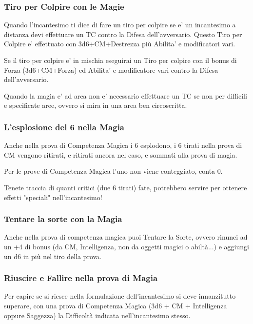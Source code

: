 \subsubsection{Tiro per Colpire con le Magie}

Quando l'incantesimo ti dice di fare un tiro per colpire se e' un incantesimo a distanza devi effettuare un TC contro la Difesa dell'avversario. Questo Tiro per Colpire e' effettuato con 3d6+CM+Destrezza più Abilita' e modificatori vari.

Se il tiro per colpire e' in mischia eseguirai un Tiro per colpire con il bonus di Forza (3d6+CM+Forza) ed Abilita' e modificatore vari contro la Difesa dell'avversario.

Quando la magia e' ad area non e' necessario effettuare un TC se non per difficili e specificate aree, ovvero si mira in una area ben circoscritta.

\subsubsection{L'esplosione del 6 nella Magia}

Anche nella prova di Competenza Magica i 6 esplodono, i 6 tirati nella prova di CM vengono ritirati, e ritirati ancora nel caso, e sommati alla prova di magia.

Per le prove di Competenza Magica l'uno non viene conteggiato, conta 0.

Tenete traccia di quanti critici (due 6 tirati) fate, potrebbero servire per ottenere effetti "speciali" nell'incantesimo!

\subsubsection{Tentare la sorte con la Magia}

Anche nella prova di competenza magica puoi Tentare la Sorte, ovvero rinunci ad un +4 di bonus (da CM, Intelligenza, non da oggetti magici o abiltà...) e aggiungi un d6 in più nel tiro della prova.

\subsubsection{Riuscire e Fallire nella prova di Magia}

Per capire se si riesce nella formulazione dell'incantesimo si deve innanzitutto superare, con una prova di Competenza Magica (3d6 + CM + Intelligenza oppure Saggezza) la Difficoltà indicata nell'incantesimo stesso.

